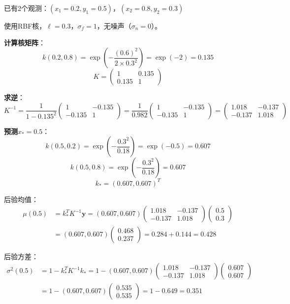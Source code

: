 \documentclass[11pt,a4paper]{article}
\theoremstyle{definition}
\begin{document}
\begin{calculation}[GP后验的完整计算]
已有2个观测：$(x_1=0.2, y_1=0.5)$，$(x_2=0.8, y_2=0.3)$

使用RBF核，$\ell = 0.3$，$\sigma_f = 1$，无噪声（$\sigma_n = 0$）。

\textbf{计算核矩阵}：
\[
k(0.2, 0.8) = \exp\left(-\frac{(0.6)^2}{2 \times 0.3^2}\right) = \exp(-2) = 0.135
\]
\[
K = \begin{pmatrix} 1 & 0.135 \\ 0.135 & 1 \end{pmatrix}
\]

\textbf{求逆}：
\[
K^{-1} = \frac{1}{1 - 0.135^2} \begin{pmatrix} 1 & -0.135 \\ -0.135 & 1 \end{pmatrix} = \frac{1}{0.982} \begin{pmatrix} 1 & -0.135 \\ -0.135 & 1 \end{pmatrix} = \begin{pmatrix} 1.018 & -0.137 \\ -0.137 & 1.018 \end{pmatrix}
\]

\textbf{预测$x_* = 0.5$}：
\[
k(0.5, 0.2) = \exp\left(-\frac{0.3^2}{0.18}\right) = \exp(-0.5) = 0.607
\]
\[
k(0.5, 0.8) = \exp\left(-\frac{0.3^2}{0.18}\right) = 0.607
\]
\[
k_* = (0.607, 0.607)^T
\]

后验均值：
\begin{align*}
\mu(0.5) &= k_*^T K^{-1} \mathbf{y} = (0.607, 0.607) \begin{pmatrix} 1.018 & -0.137 \\ -0.137 & 1.018 \end{pmatrix} \begin{pmatrix} 0.5 \\ 0.3 \end{pmatrix} \\
&= (0.607, 0.607) \begin{pmatrix} 0.468 \\ 0.237 \end{pmatrix} = 0.284 + 0.144 = 0.428
\end{align*}

后验方差：
\begin{align*}
\sigma^2(0.5) &= 1 - k_*^T K^{-1} k_* = 1 - (0.607, 0.607) \begin{pmatrix} 1.018 & -0.137 \\ -0.137 & 1.018 \end{pmatrix} \begin{pmatrix} 0.607 \\ 0.607 \end{pmatrix} \\
&= 1 - (0.607, 0.607) \begin{pmatrix} 0.535 \\ 0.535 \end{pmatrix} = 1 - 0.649 = 0.351
\end{align*}


\end{calculation}
\end{document}
